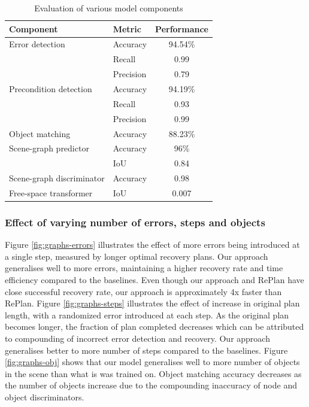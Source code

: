 \begin{table}
    \centering
    \begin{tabular}{|l|l|c|}
    \hline
    Component & Metric & Performance\\
    \hline
    \hline
    Error detection & Accuracy & 94.54\%\\
    & Recall & 0.99\\
    & Precision & 0.79\\
    \hline
    Precondition detection & Accuracy & 94.19\% \\
    & Recall & 0.93\\
    & Precision & 0.99\\
    \hline
    Object matching & Accuracy & 88.23\% \\
    \hline
    Scene-graph predictor & Accuracy & 96\% \\
    & IoU & 0.84 \\
    \hline
    Scene-graph discriminator & Accuracy & 0.98\\
    \hline
    Free-space transformer & IoU & 0.007\\
    \hline
    \end{tabular}
    \caption{Evaluation of various model components}
    \label{tab:model-comp}
\end{table}

\subsubsection{Effect of varying number of errors, steps and objects}
%
Figure \ref{fig:graphs-errors} illustrates the effect of more errors being introduced at a single step, measured by longer optimal recovery plans. Our approach generalises well to more errors, maintaining a higher recovery rate and time efficiency compared to the baselines. Even though our approach and RePlan have close successful recovery rate, our approach is approximately 4x faster than RePlan.
%
Figure \ref{fig:graphs-steps} illustrates the effect of increase in original plan length, with a randomized error introduced at each step. As the original plan becomes longer, the fraction of plan completed decreases which can be attributed to compounding of incorrect error detection and recovery. Our approach generalises better to more number of steps compared to the baselines. 
%
Figure \ref{fig:graphs-obj} shows that our model generalises well to more number of objects in the scene than what is was trained on. Object matching accuracy decreases as the number of objects increase due to the compounding inaccuracy of node and object discriminators.

